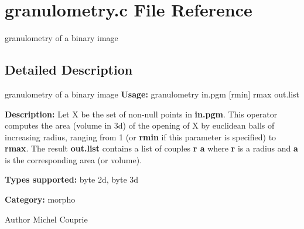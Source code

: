 \section{granulometry.c File Reference}
\label{granulometry_8c}


granulometry of a binary image  




\subsection{Detailed Description}
granulometry of a binary image {\bfseries Usage:} granulometry in.pgm [rmin] rmax out.list

{\bfseries Description:} Let X be the set of non-\/null points in {\bfseries in.pgm}. This operator computes the area (volume in 3d) of the opening of X by euclidean balls of increasing radius, ranging from 1 (or {\bfseries rmin} if this parameter is specified) to {\bfseries rmax}. The result {\bfseries out.list} contains a list of couples {\bfseries r a} where {\bfseries r} is a radius and {\bfseries a} is the corresponding area (or volume).

{\bfseries Types supported:} byte 2d, byte 3d

{\bfseries Category:} morpho

\begin{DoxyAuthor}{Author}
Michel Couprie 
\end{DoxyAuthor}
